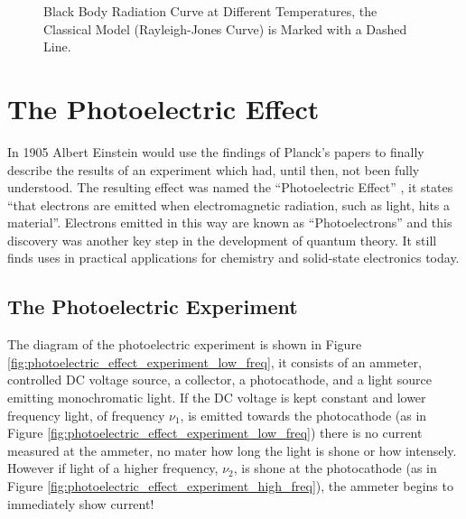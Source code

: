 \documentclass[colorlinks,11pt,a4paper,normalphoto,withhyper,ragged2e]{altareport}
\def\tick#1#2{\draw[thick] (#1) ++ (#2:0.09) --++ (#2-180:0.18)}
\begin{document}
\begin{figure}[!h]
			
			\caption{Black Body Radiation Curve at Different Temperatures, the Classical Model (Rayleigh-Jones Curve) is Marked with a Dashed Line.}
			\label{fig:curve_black_body_radiation}
		\end{figure}
		
		
		\pagebreak
	
	
	
	
\section{The Photoelectric Effect}
	In 1905 Albert Einstein would use the findings of Planck's papers to finally describe the results of an experiment which had, until then, not been fully understood. The resulting effect was named the ``Photoelectric Effect''  \cite{wiki_photoelectric_effect}, it states ``that electrons are emitted when electromagnetic radiation, such as light, hits a material''. Electrons emitted in this way are known as ``Photoelectrons'' and this discovery was another key step in the development of quantum theory. It still finds uses in practical applications for chemistry and solid-state electronics today. \linebreak
	
	
	\subsection{The Photoelectric Experiment}
	The diagram of the photoelectric experiment is shown in Figure \ref{fig:photoelectric_effect_experiment_low_freq}, it consists of an ammeter, controlled DC voltage source, a collector, a photocathode, and a light source emitting monochromatic light.\linebreak
	If the DC voltage is kept constant and lower frequency light, of frequency $\nu_1$, is emitted towards the photocathode (as in Figure \ref{fig:photoelectric_effect_experiment_low_freq}) there is no current measured at the ammeter, no mater how long the light is shone or how intensely. \linebreak 
	However if light of a higher frequency, $\nu_2$, is shone at the photocathode (as in Figure \ref{fig:photoelectric_effect_experiment_high_freq}), the ammeter begins to immediately show current! \linebreak
	
\end{document}
